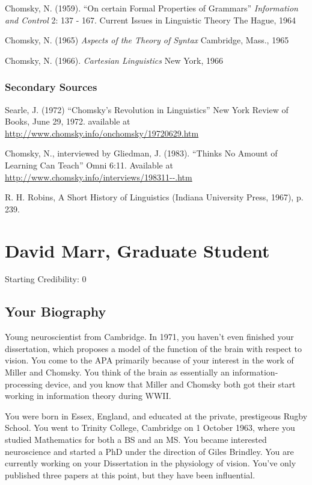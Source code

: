 \begin{refsection}
Chomsky, N. (1959). ``On certain Formal Properties of Grammars'' \emph{Information and Control} 2: 137 - 167. Current Issues in Linguistic Theory The Hague, 1964

Chomsky, N. (1965) \emph{Aspects of the Theory of Syntax} Cambridge, Mass., 1965

Chomsky, N. (1966). \emph{Cartesian Linguistics} New York, 1966

\subsection{Secondary Sources}
\label{secondarysources}

Searle, J. (1972) “Chomsky's Revolution in Linguistics” New York Review of Books, June 29, 1972. available at \url{http://www.chomsky.info/onchomsky/19720629.htm}

Chomsky, N., interviewed by Gliedman, J. (1983). “Thinks No Amount of Learning Can Teach” Omni 6:11. Available at \url{http://www.chomsky.info/interviews/198311--.htm}

R. H. Robins, A Short History of Linguistics (Indiana University Press, 1967), p. 239.

\chapter{David Marr, Graduate Student}
\label{davidmarrgraduatestudent}

Starting Credibility: 0

\section{Your Biography}
\label{yourbiography}

Young neuroscientist from Cambridge. In 1971, you haven't even finished your dissertation, which proposes a model of the function of the brain with respect to vision. You come to the APA primarily because of your interest in the work of Miller and Chomsky. You think of the brain as essentially an information-processing device, and you know that Miller and Chomsky both got their start working in information theory during WWII.

You were born in Essex, England, and educated at the private, prestigeous Rugby School. You went to Trinity College, Cambridge on 1 October 1963, where you studied Mathematics for both a BS and an MS. You became interested neuroscience and started a PhD under the direction of Giles Brindley. You are currently working on your Dissertation in the physiology of vision. You've only published three papers at this point, but they have been influential.


\end{refsection}
